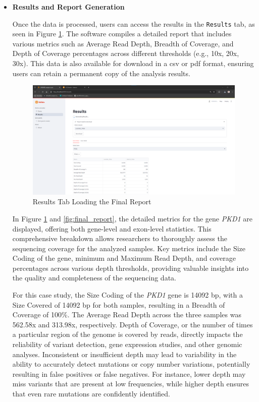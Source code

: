 \begin{itemize}
    \item \textbf{Results and Report Generation}

    Once the data is processed, users can access the results in the \texttt{Results} tab, as seen in Figure \ref{fig:results_loading}. The software compiles a detailed report that includes various metrics such as Average Read Depth, Breadth of Coverage, and Depth of Coverage percentages across different thresholds (e.g., 10x, 20x, 30x). This data is also available for download in a \ac{csv} or \ac{pdf} format, ensuring users can retain a permanent copy of the analysis results.
    
    \begin{figure}[H]
        \centering
        \includegraphics[width=\textwidth]{figs/v3.3.png}
        \caption{Results Tab Loading the Final Report}
        \label{fig:results_loading}
    \end{figure}
    
    In Figure \ref{fig:results_loading} and \ref{fig:final_report}, the detailed metrics for the gene \textit{PKD1} are displayed, offering both gene-level and exon-level statistics. This comprehensive breakdown allows researchers to thoroughly assess the sequencing coverage for the analyzed samples. Key metrics include the Size Coding of the gene, minimum and Maximum Read Depth, and coverage percentages across various depth thresholds, providing valuable insights into the quality and completeness of the sequencing data.
    
    For this case study, the Size Coding of the \textit{PKD1} gene is 14092 \ac{bp}, with a Size Covered of 14092 \ac{bp} for both samples, resulting in a Breadth of Coverage of 100\%. The Average Read Depth across the three samples was 562.58x and 313.98x, respectively. Depth of Coverage, or the number of times a particular region of the genome is covered by reads, directly impacts the reliability of variant detection, gene expression studies, and other genomic analyses. Inconsistent or insufficient depth may lead to variability in the ability to accurately detect mutations or copy number variations, potentially resulting in false positives or false negatives. For instance, lower depth may miss variants that are present at low frequencies, while higher depth ensures that even rare mutations are confidently identified. \cite{Larson2023}
    

\end{itemize}
